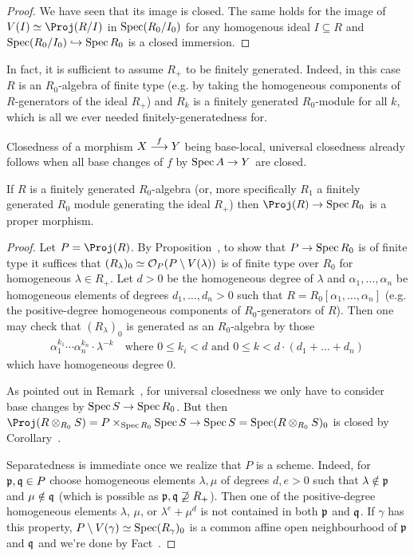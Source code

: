 \documentclass[a4paper,parskip=half,numbers=enddot, DIV=12]{scrreprt}
\begin{document}
\begin{proof}
    We have seen that its image is closed. The same holds for the image of $V(I) \simeq \Proj(R/I)$ in $\operatorname{Spec} (R_0/I_0)$ for any homogenous ideal $I\subseteq R$ and $\Spec (R_0/I_0)\monomorphism \Spec R_0$ is a closed immersion.
\end{proof}
\begin{rem}
    In fact, it is sufficient to assume $R_+$ to be finitely generated. Indeed, in this case $R$ is an $R_0$-algebra of finite type (e.g. by taking the homogeneous components of $R$-generators of the ideal $R_+$) and $R_k$ is a finitely generated $R_0$-module for all $k$, which is all we ever needed finitely-generatedness for.
\end{rem}
\begin{rem}
    Closedness of a morphism $X\morphism[f] Y$ being base-local, universal closedness already follows when all base changes of $f$ by $\Spec A \morphism Y$ are closed.
\end{rem}
\begin{cor}
    If $R$ is a finitely generated $R_0$-algebra (or, more specifically $R_1$ a finitely generated $R_0$ module generating the ideal $R_+$) then $\Proj(R)\morphism \Spec R_0$ is a proper morphism.
\end{cor}
\begin{proof}
	Let $P=\Proj(R)$. By Proposition~, to show that $P\morphism\Spec R_0$ is of finite type it suffices that $(R_\lambda)_0\simeq \mathcal{O}_P(P\setminus V(\lambda))$ is of finite type over $R_0$ for homogeneous $\lambda\in R_+$. Let $d>0$ be the homogeneous degree of $\lambda$ and  $\alpha_1,\ldots,\alpha_n$ be homogeneous elements of degrees $d_1,\ldots,d_n>0$ such that $R=R_0[\alpha_1,\ldots,\alpha_n]$ (e.g. the positive-degree homogeneous components of $R_0$-generators of $R$). Then one may check that $(R_\lambda)_0$ is generated as an $R_0$-algebra by those
	\begin{align*}
		\alpha_1^{k_1}\cdots \alpha_n^{k_n}\cdot\lambda^{-k}\quad\text{where }0\leq k_i<d\text{ and }0\leq k<d\cdot(d_1+\ldots+d_n)
	\end{align*}
	which have homogeneous degree $0$.
	
	As pointed out in Remark~, for universal closedness we only have to consider base changes by $\Spec S\morphism\Spec R_0$. But then $\Proj(R\otimes_{R_0}S)=P\times_{\Spec R_0}\Spec S\morphism\Spec S=\Spec (R\otimes_{R_0}S)_0$ is closed by Corollary~.
	
	Separatedness is immediate once we realize that $P$ is a scheme. Indeed, for $\mathfrak{p},\mathfrak{q}\in P$ choose homogeneous elements $\lambda,\mu$ of degrees $d,e>0$ such that $\lambda\notin\mathfrak{p}$ and $\mu\notin\mathfrak{q}$ (which is possible as $\mathfrak{p},\mathfrak{q}\not\supseteq R_+$). Then one of the positive-degree homogeneous elements $\lambda$, $\mu$, or $\lambda^e+\mu^d$ is not contained in both $\mathfrak{p}$ and $\mathfrak{q}$. If $\gamma$ has this property, $P\setminus V(\gamma)\simeq \operatorname{Spec} (R_\gamma)_0$ is a common affine open neighbourhood of $\mathfrak{p}$ and $\mathfrak{q}$ and we're done by Fact~.
\end{proof}
\end{document}

